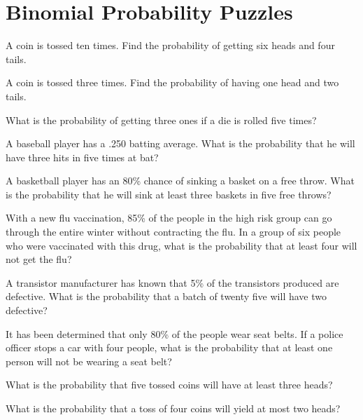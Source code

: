 \section{Binomial Probability Puzzles}

\begin{puzzle}
    A coin is tossed ten times. Find the probability of getting six heads and four tails.
\end{puzzle}

\begin{puzzle}
    A coin is tossed three times. Find the probability of having one head and two tails.
\end{puzzle}

\begin{puzzle}
    What is the probability of getting three ones if a die is rolled five times?
\end{puzzle}

\begin{puzzle}
    A baseball player has a .250 batting average. What is the probability that he will have three hits in five times at bat?
\end{puzzle}

\begin{puzzle}
    A basketball player has an 80\% chance of sinking a basket on a free throw. What is the probability that he will sink at least three baskets in five free throws?
\end{puzzle}

\begin{puzzle}
    With a new flu vaccination, 85\% of the people in the high risk group can go through the entire winter without contracting the flu. In a group of six people who were vaccinated with this drug, what is the probability that at least four will not get the flu?
\end{puzzle}

\begin{puzzle}
    A transistor manufacturer has known that 5\% of the transistors produced are defective. What is the probability that a batch of twenty five will have two defective?
\end{puzzle}

\begin{puzzle}
    It has been determined that only 80\% of the people wear seat belts. If a police officer stops a car with four people, what is the probability that at least one person will not be wearing a seat belt?
\end{puzzle}

\begin{puzzle}
    What is the probability that  five tossed coins will have at least three heads?
\end{puzzle}

\begin{puzzle}
    What is the probability that a toss of four coins will yield at most two heads?
\end{puzzle}
